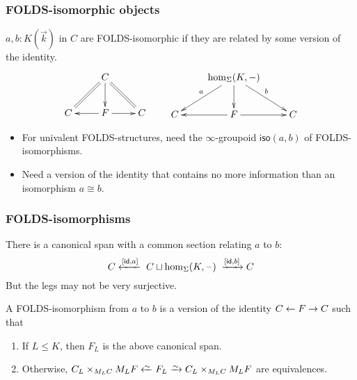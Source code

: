 \documentclass{beamer}
\newcommand{\blank}{\mathord{\hspace{1pt}\text{--}\hspace{1pt}}}
\begin{document}
\begin{frame}
  \frametitle{FOLDS-isomorphic objects}
  \begin{definition}[Makkai]
    $a,b:K(\vec{k})$ in $C$ are \alert<1>{FOLDS-isomorphic} if they are related by some version of the identity.
    \[ \xymatrix{ &C \ar[d] \ar@{=}[dl] \ar@{=}[dr] \\ C & F \ar[l] \ar[r] & C }
    \qquad
    \xymatrix{ &\hom_\Sigma(K,-) \ar[d] \ar[dl]_a \ar[dr]^b \\ C & F \ar[l] \ar[r] & C }
    \]
  \end{definition}
  \pause
  \begin{itemize}
  \item For univalent FOLDS-structures, need \alert<2>{the $\infty$-groupoid} $\mathsf{iso}(a,b)$ of FOLDS-isomorphisms.
  \item Need a version of the identity that contains \alert<2>{no more information} than an isomorphism $a\cong b$.
  \end{itemize}
\end{frame}

\begin{frame}
  \frametitle{FOLDS-isomorphisms}
  There is a canonical span with a common section relating $a$ to $b$:
  \[ C \xot{[\mathsf{id},a]} \;C \sqcup \hom_\Sigma(K,\blank)\; \xto{[\mathsf{id},b]} C \]
  But the legs may not be very surjective.
  \begin{definition}
    A \alert{FOLDS-isomorphism} from $a$ to $b$ is a version of the identity $C\leftarrow F \to C$ such that
    \begin{enumerate}
    \item If $L\le K$, then $F_L$ is the above canonical span.
    \item Otherwise, $C_L \times_{M_L C} M_L F \otiso F_L \toiso C_L \times_{M_L C} M_L F$ are equivalences.
    \end{enumerate}
  \end{definition}
\end{frame}
\end{document}
